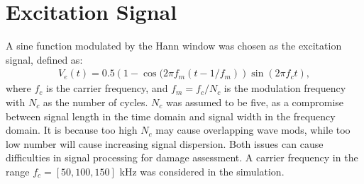 \section{Excitation Signal}
\label{sec:excitation}

A sine function modulated by the Hann window was chosen as the excitation signal, defined as:
\begin{eqnarray}
	V_e(t) = 0.5\left(1-\cos(2\pi f_m(t-1/f_m)\right)\sin(2\pi f_ct),
\end{eqnarray}
where \(f_c\) is the carrier frequency, and \(f_m=f_c/N_c\) is the modulation frequency with \(N_c\) as the number of cycles.
\(N_c\) was assumed to be five, as a compromise between signal length in the time domain and signal width in the frequency domain.
It is because too high \(N_c\) may cause overlapping wave mods, while too low number will cause increasing signal dispersion.
Both issues can cause difficulties in signal processing for damage assessment.
A carrier frequency in the range \(f_c=[50, 100, 150] \) kHz was considered in the simulation.
